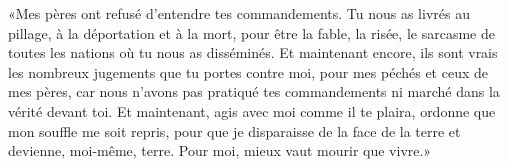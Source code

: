 «Mes pères ont refusé d’entendre tes commandements.
Tu nous as livrés au pillage, à la déportation et à la mort,
	pour être la fable, la risée, le sarcasme de toutes les nations
		où tu nous as disséminés.
Et maintenant encore, ils sont vrais les nombreux jugements que tu portes contre moi,
	pour mes péchés et ceux de mes pères,
	car nous n’avons pas pratiqué tes commandements ni marché dans la vérité devant toi.
Et maintenant, agis avec moi comme il te plaira,
	ordonne que mon souffle me soit repris,
	pour que je disparaisse de la face de la terre et devienne, moi-même, terre.
Pour moi, mieux vaut mourir que vivre.»
